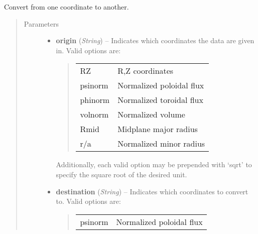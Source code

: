 \documentclass[letterpaper,10pt,english]{sphinxmanual}
\begin{document}
\begin{fulllineitems}
\begin{quote}
\begin{description}
\begin{itemize}
\end{itemize}

\end{description}\end{quote}

\begin{fulllineitems}
\label{eqtools:eqtools.core.Equilibrium.rho2rho}
Convert from one coordinate to another.
\begin{quote}\begin{description}
\item[{Parameters}] \leavevmode\begin{itemize}
\item {} 
\textbf{origin} (\emph{String}) -- 
Indicates which coordinates the data are given in.
Valid options are:
\begin{quote}

\begin{tabulary}{\linewidth}{|L|L|}
\hline

RZ
 & 
R,Z coordinates
\\

psinorm
 & 
Normalized poloidal flux
\\

phinorm
 & 
Normalized toroidal flux
\\

volnorm
 & 
Normalized volume
\\

Rmid
 & 
Midplane major radius
\\

r/a
 & 
Normalized minor radius
\\
\hline\end{tabulary}

\end{quote}

Additionally, each valid option may be prepended with `sqrt'
to specify the square root of the desired unit.


\item {} 
\textbf{destination} (\emph{String}) -- 
Indicates which coordinates to convert to.
Valid options are:
\begin{quote}

\begin{tabulary}{\linewidth}{|L|L|}
\hline

psinorm
 & 
Normalized poloidal flux
\\


\end{tabulary}
\end{quote}
\end{itemize}
\end{description}
\end{quote}
\end{fulllineitems}
\end{fulllineitems}
\end{document}
